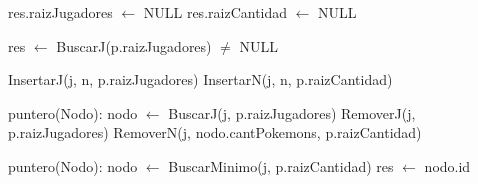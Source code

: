 \begin{Algoritmos}

	\begin{algorithm}[H]
		\NoCaptionOfAlgo
		\caption{}
		res.raizJugadores $\leftarrow$ NULL\;
		res.raizCantidad $\leftarrow$ NULL\;
	\end{algorithm}

	\begin{algorithm}[H]
		\NoCaptionOfAlgo
		\caption{}
		res $\leftarrow$ BuscarJ(p.raizJugadores) $\neq$ NULL\;
	\end{algorithm}

	\begin{algorithm}[H]
		\NoCaptionOfAlgo
		\caption{}
		InsertarJ(j, n, p.raizJugadores)\;
		InsertarN(j, n, p.raizCantidad)\;
	\end{algorithm}

	\begin{algorithm}[H]
		\NoCaptionOfAlgo
		\caption{}
		puntero(Nodo): nodo $\leftarrow$ BuscarJ(j, p.raizJugadores)\;
		RemoverJ(j, p.raizJugadores)\;
		RemoverN(j, nodo.cantPokemons, p.raizCantidad)\;
	\end{algorithm}

	\begin{algorithm}[H]
		\NoCaptionOfAlgo
		\caption{}
	\end{algorithm}

	\begin{algorithm}[H]
		\NoCaptionOfAlgo
		\caption{}
		puntero(Nodo): nodo $\leftarrow$ BuscarMinimo(j, p.raizCantidad)\;
		res $\leftarrow$ nodo.id\;
	\end{algorithm}

	\begin{algorithm}[H]
		\NoCaptionOfAlgo
		\caption{}
	\end{algorithm}


\end{Algoritmos}
